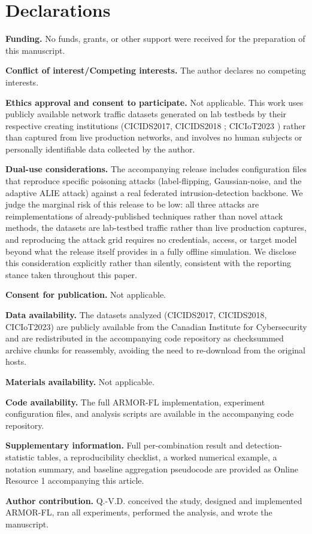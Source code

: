 \documentclass[pdflatex,iicol,sn-mathphys-num]{sn-jnl}%
\theoremstyle{thmstyleone}%
\theoremstyle{thmstyletwo}%
\theoremstyle{thmstylethree}%
\begin{document}
\backmatter

\section*{Declarations}

\textbf{Funding.} No funds, grants, or other support were received for the preparation of this manuscript.

\textbf{Conflict of interest/Competing interests.} The author declares no competing interests.

\textbf{Ethics approval and consent to participate.} Not applicable. This work uses publicly available network traffic datasets generated on lab testbeds by their respective creating institutions (CICIDS2017, CICIDS2018 \citep{sharafaldin2018cicids}; CICIoT2023 \citep{neto2023ciciot2023}) rather than captured from live production networks, and involves no human subjects or personally identifiable data collected by the author.

\textbf{Dual-use considerations.} The accompanying release includes configuration files that reproduce specific poisoning attacks (label-flipping, Gaussian-noise, and the adaptive ALIE attack) against a real federated intrusion-detection backbone. We judge the marginal risk of this release to be low: all three attacks are reimplementations of already-published techniques \citep{baruch2019alie} rather than novel attack methods, the datasets are lab-testbed traffic rather than live production captures, and reproducing the attack grid requires no credentials, access, or target model beyond what the release itself provides in a fully offline simulation. We disclose this consideration explicitly rather than silently, consistent with the reporting stance taken throughout this paper.

\textbf{Consent for publication.} Not applicable.

\textbf{Data availability.} The datasets analyzed (CICIDS2017, CICIDS2018, CICIoT2023) are publicly available from the Canadian Institute for Cybersecurity and are redistributed in the accompanying code repository as checksummed archive chunks for reassembly, avoiding the need to re-download from the original hosts.

\textbf{Materials availability.} Not applicable.

\textbf{Code availability.} The full ARMOR-FL implementation, experiment configuration files, and analysis scripts are available in the accompanying code repository.

\textbf{Supplementary information.} Full per-combination result and detection-statistic tables, a reproducibility checklist, a worked numerical example, a notation summary, and baseline aggregation pseudocode are provided as Online Resource 1 accompanying this article.

\textbf{Author contribution.} Q.-V.D. conceived the study, designed and implemented ARMOR-FL, ran all experiments, performed the analysis, and wrote the manuscript.

\end{document}
